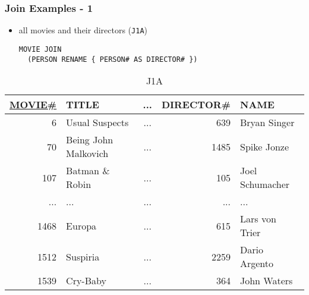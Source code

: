 \documentclass[dvipsnames]{beamer}
\theoremstyle{plain}
\begin{document}
\begin{frame}[fragile]
  \frametitle{Join Examples - 1}

  \begin{itemize}
    \item all movies and their directors (\texttt{J1A})
    \begin{lstlisting}
MOVIE JOIN
  (PERSON RENAME { PERSON# AS DIRECTOR# })
    \end{lstlisting}
  \end{itemize}

  \vspace{-10pt}
  \begin{tiny}
  \begin{table}
    \caption{J1A}
    \begin{tabular}{|r|l|c|r|l|}\hline
\underline{MOVIE\#} & TITLE & ... & DIRECTOR\# & NAME            \\[2pt]\hline\hline
   6 & Usual Suspects       & ... &       639  & Bryan Singer    \\\hline
  70 & Being John Malkovich & ... &      1485  & Spike Jonze     \\\hline
 107 & Batman \& Robin      & ... &       105  & Joel Schumacher \\\hline
 ... & ...                  & ... &       ...  & ...             \\\hline
1468 & Europa               & ... &       615  & Lars von Trier  \\\hline
1512 & Suspiria             & ... &      2259  & Dario Argento   \\\hline
1539 & Cry-Baby             & ... &       364  & John Waters     \\\hline
    \end{tabular}
  \end{table}
  \end{tiny}
\end{frame}
\end{document}
